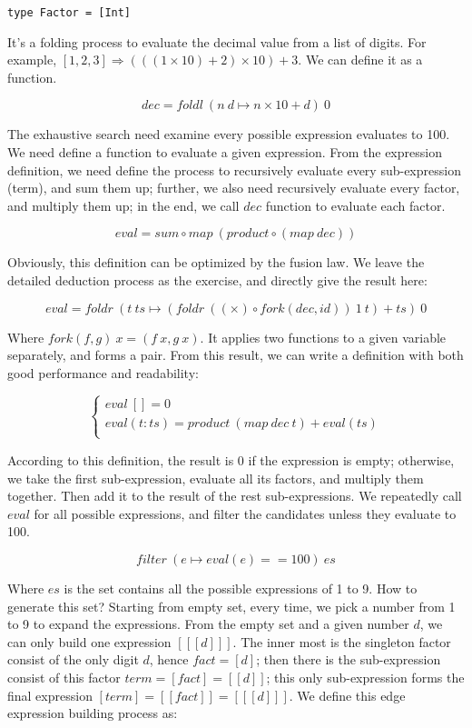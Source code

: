 \documentclass{article}
\begin{document}
\begin{lstlisting}
type Factor = [Int]
\end{lstlisting}

It's a folding process to evaluate the decimal value from a list of digits. For example, $[1, 2, 3] \Rightarrow (((1 \times 10) + 2) \times 10) + 3$. We can define it as a function.

\[
dec = foldl\ (n\ d \mapsto n \times 10 + d)\ 0
\]

The exhaustive search need examine every possible expression evaluates to 100. We need define a function to evaluate a given expression. From the expression definition, we need define the process to recursively evaluate every sub-expression (term), and sum them up; further, we also need recursively evaluate every factor, and multiply them up; in the end, we call $dec$ function to evaluate each factor.

\[
eval = sum \circ map\ (product \circ (map\ dec))
\]

Obviously, this definition can be optimized by the fusion law. We leave the detailed deduction process as the exercise, and directly give the result here:

\[
eval = foldr\ (t\ ts \mapsto (foldr\ ((\times) \circ fork(dec, id))\ 1\ t) + ts)\ 0
\]

Where $fork(f, g)\ x = (f\ x, g\ x)$. It applies two functions to a given variable separately, and forms a pair. From this result, we can write a definition with both good performance and readability:

\[
\begin{cases}
eval\ [] = 0 \\
eval (t:ts) = product\ (map\ dec\ t) + eval(ts) \\
\end{cases}
\]

According to this definition, the result is 0 if the expression is empty; otherwise, we take the first sub-expression, evaluate all its factors, and multiply them together. Then add it to the result of the rest sub-expressions. We repeatedly call $eval$ for all possible expressions, and filter the candidates unless they evaluate to 100.

\[
filter\ (e \mapsto eval(e) == 100)\ es
\]

Where $es$ is the set contains all the possible expressions of 1 to 9. How to generate this set? Starting from empty set, every time, we pick a number from 1 to 9 to expand the expressions. From the empty set and a given number $d$, we can only build one expression $[[[d]]]$. The inner most is the singleton factor consist of the only digit $d$, hence $fact = [d]$; then there is the sub-expression consist of this factor $term = [fact] = [[d]]$; this only sub-expression forms the final expression $[term] = [[fact]] = [[[d]]]$. We define this edge expression building process as:
\end{document}
